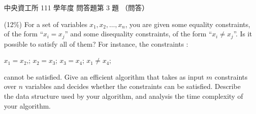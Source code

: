 \begin{pastexam}[label={px:ncu-111-dsa-15}]{中央資工所 111 學年度 問答題第 3 題}
（問答）

(12\%) For a set of variables $x_1, x_2, \ldots, x_n$, you are given some equality constraints, of
the form ``$x_i = x_j$'' and some disequality constraints, of the form ``$x_i \neq x_j$''. Is it
possible to satisfy all of them? For instance, the constraints :

\quad $x_1 = x_2$,; $x_2 = x_3$; $x_3 = x_4$; $x_1 \neq x_4$;

cannot be satisfied. Give an efficient algorithm that takes as input $m$ constraints over $n$
variables and decides whether the constraints can be satisfied. Describe the data structure used
by your algorithm, and analysis the time complexity of your algorithm.
\end{pastexam}

